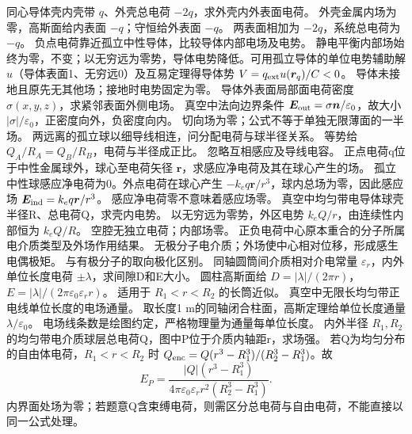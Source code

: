 \problemtext 同心导体壳内壳带 $q$、外壳总电荷 $-2q$，求外壳内外表面电荷。
\workings 外壳金属内场为零，高斯面给内表面 $-q$；守恒给外表面 $-q$。
\crosscheck 两表面相加为 $-2q$，系统总电荷为 $-q$。
\problemtext 负点电荷靠近孤立中性导体，比较导体内部电场及电势。
\workings 静电平衡内部场始终为零，不变；以无穷远为零势，导体电势降低。可用孤立导体的单位电势辅助解 $u$（导体表面1、无穷远0）及互易定理得导体势 $V=q_{\rm ext}u(\bm r_q)/C<0$。
\crosscheck 导体未接地且原先无其他场；接地时电势固定为零。
\problemtext 导体外表面局部面电荷密度 $\sigma(x,y,z)$，求紧邻表面外侧电场。
\workings 真空中法向边界条件 $\bm E_{\rm out}=\sigma\bm n/\varepsilon_0$，故大小 $|\sigma|/\varepsilon_0$，正密度向外，负密度向内。
\crosscheck 切向场为零；公式不等于单独无限薄面的一半场。
\problemtext 两远离的孤立球以细导线相连，问分配电荷与球半径关系。
\workings 等势给 $Q_A/R_A=Q_B/R_B$，电荷与半径成正比。
\crosscheck 忽略互相感应及导线电容。
\problemtext 正点电荷q位于中性金属球外，球心至电荷矢径 $\bm r$，求感应净电荷及其在球心产生的场。
\workings 孤立中性球感应净电荷为0。外点电荷在球心产生 $-k_eq\bm r/r^3$，球内总场为零，因此感应场 $\bm E_{\rm ind}=k_eq\bm r/r^3$。
\crosscheck 感应净电荷零不意味着感应场零。
\problemtext 真空中均匀带电导体球壳半径R、总电荷Q，求壳内电势。
\workings 以无穷远为零势，外区电势 $k_eQ/r$，由连续性内部恒为 $k_eQ/R$。
\crosscheck 空腔无独立电荷；内部场零。
\problemtext 正负电荷中心原本重合的分子所属电介质类型及外场作用结果。
\workings 无极分子电介质；外场使中心相对位移，形成感生电偶极矩。
\crosscheck 与有极分子的取向极化区别。
\problemtext 同轴圆筒间介质相对介电常量 $\varepsilon_r$，内外单位长度电荷 $\pm\lambda$，求间隙D和E大小。
\workings 圆柱高斯面给 $D=|\lambda|/(2\pi r)$，$E=|\lambda|/(2\pi\varepsilon_0\varepsilon_r r)$。
\crosscheck 适用于 $R_1<r<R_2$ 的长筒近似。
\problemtext 真空中无限长均匀带正电线单位长度的电场通量。
\workings 取长度1 m的同轴闭合柱面，高斯定理给单位长度通量 $\lambda/\varepsilon_0$。
\crosscheck 电场线条数是绘图约定，严格物理量为通量每单位长度。
\problemtext 内外半径 $R_1,R_2$ 的均匀带电介质球层总电荷Q，图中P位于介质内轴距r，求场强。
\workings 若Q为均匀分布的自由体电荷，$R_1<r<R_2$ 时 $Q_{\rm enc}=Q(r^3-R_1^3)/(R_2^3-R_1^3)$。故
\[
E_P=\frac{|Q|(r^3-R_1^3)}{4\pi\varepsilon_0\varepsilon_r r^2(R_2^3-R_1^3)}.
\]
\crosscheck 内界面处场为零；若题意Q含束缚电荷，则需区分总电荷与自由电荷，不能直接以同一公式处理。

